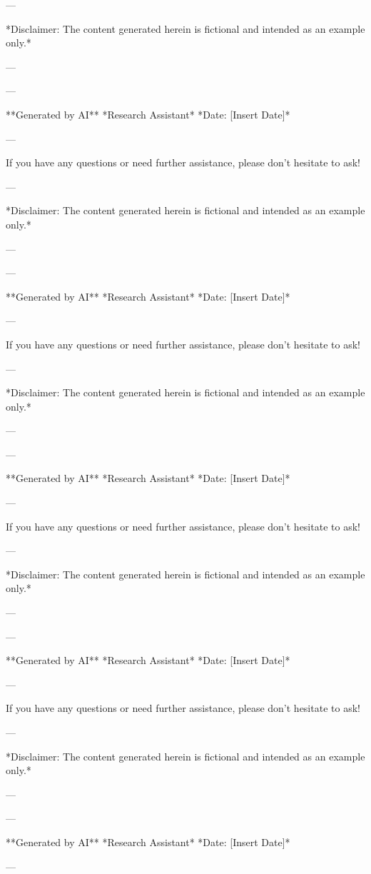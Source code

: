 --- 

*Disclaimer: The content generated herein is fictional and intended as an example only.* 

--- 

--- 

**Generated by AI** 
*Research Assistant* 
*Date: [Insert Date]*

--- 

If you have any questions or need further assistance, please don't hesitate to ask! 

--- 

*Disclaimer: The content generated herein is fictional and intended as an example only.* 

--- 

--- 

**Generated by AI** 
*Research Assistant* 
*Date: [Insert Date]*

--- 

If you have any questions or need further assistance, please don't hesitate to ask! 

--- 

*Disclaimer: The content generated herein is fictional and intended as an example only.* 

--- 

--- 

**Generated by AI** 
*Research Assistant* 
*Date: [Insert Date]*

--- 

If you have any questions or need further assistance, please don't hesitate to ask! 

--- 

*Disclaimer: The content generated herein is fictional and intended as an example only.* 

--- 

--- 

**Generated by AI** 
*Research Assistant* 
*Date: [Insert Date]*

--- 

If you have any questions or need further assistance, please don't hesitate to ask! 

--- 

*Disclaimer: The content generated herein is fictional and intended as an example only.* 

--- 

--- 

**Generated by AI** 
*Research Assistant* 
*Date: [Insert Date]*

--- 

